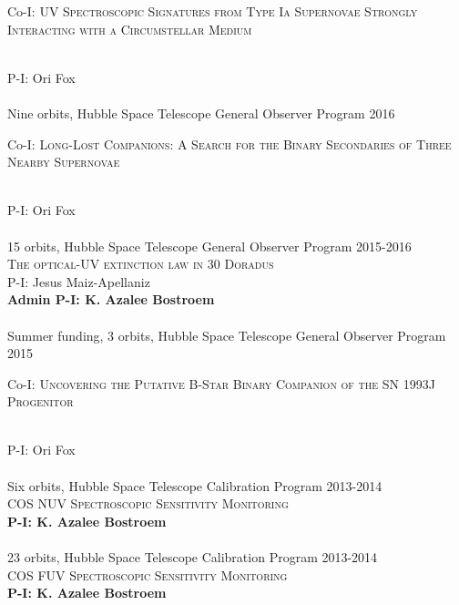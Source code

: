 \documentclass[10pt]{cv}
\begin{document}
\begin{llist}
\begin{minipage}[l]{0.7\textwidth}
Co-I: \textsc{UV Spectroscopic Signatures from Type Ia Supernovae Strongly Interacting with a Circumstellar Medium}
\end{minipage}\vspace{0.15cm}\\
P-I: Ori Fox \\
\\
Nine orbits, Hubble Space Telescope General Observer Program \hfill 2016\\ %
\begin{minipage}[l]{0.7\textwidth}\vspace{0.15cm}
Co-I: \textsc{Long-Lost Companions: A Search for the Binary Secondaries of Three Nearby Supernovae}
\end{minipage}\vspace{0.15cm}\\
P-I: Ori Fox \\
\\
15 orbits, Hubble Space Telescope General Observer Program \hfill 2015-2016\\ %
\textsc{The optical-UV extinction law in 30 Doradus}\\
P-I: Jesus Maiz-Apellaniz \\
{\bf Admin P-I: K. Azalee Bostroem} \\
\\
Summer funding, 3 orbits, Hubble Space Telescope General Observer Program \hfill 2015\\ %
\begin{minipage}[l]{0.7\textwidth}\vspace{0.15cm}
Co-I: \textsc{Uncovering the Putative B-Star Binary Companion of the SN 1993J Progenitor}
\end{minipage}\vspace{0.15cm}\\
P-I: Ori Fox \\
\\
Six orbits, Hubble Space Telescope Calibration Program \hfill 2013-2014\\ %
\textsc{COS NUV Spectroscopic Sensitivity Monitoring}\\
{\bf P-I: K. Azalee Bostroem} \\ %
\\
23 orbits, Hubble Space Telescope Calibration Program \hfill 2013-2014\\ %
\textsc{COS FUV Spectroscopic Sensitivity Monitoring}\\
{\bf P-I: K. Azalee Bostroem} \\ %

\end{llist}
\end{document}
